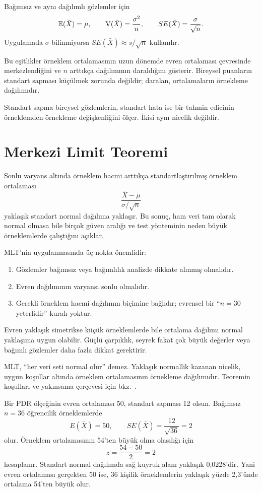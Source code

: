 Bağımsız ve aynı dağılımlı gözlemler için
\[
\mathbb{E}(\bar X)=\mu,
\qquad
\operatorname{V}(\bar X)=\frac{\sigma^2}{n},
\qquad
SE(\bar X)=\frac{\sigma}{\sqrt n}.
\]
Uygulamada $\sigma$ bilinmiyorsa $SE(\bar X)\approx s/\sqrt n$ kullanılır.

Bu eşitlikler örneklem ortalamasının uzun dönemde evren ortalaması çevresinde
merkezlendiğini ve $n$ arttıkça dağılımının daraldığını gösterir. Bireysel
puanların standart sapması küçülmek zorunda değildir; daralan, ortalamaların
örnekleme dağılımıdır.

\begin{mistakebox}
Standart sapma bireysel gözlemlerin, standart hata ise bir tahmin edicinin
örneklemden örnekleme değişkenliğini ölçer. İkisi aynı nicelik değildir.
\end{mistakebox}

\section{Merkezi Limit Teoremi}

Sonlu varyans altında örneklem hacmi arttıkça standartlaştırılmış örneklem
ortalaması
\[
\frac{\bar X-\mu}{\sigma/\sqrt n}
\]
yaklaşık standart normal dağılıma yaklaşır. Bu sonuç, ham veri tam olarak
normal olmasa bile birçok güven aralığı ve test yönteminin neden büyük
örneklemlerde çalıştığını açıklar.

MLT'nin uygulanmasında üç nokta önemlidir:

\begin{enumerate}
  \item Gözlemler bağımsız veya bağımlılık analizde dikkate alınmış olmalıdır.
  \item Evren dağılımının varyansı sonlu olmalıdır.
  \item Gerekli örneklem hacmi dağılımın biçimine bağlıdır; evrensel bir ``$n=30$ yeterlidir'' kuralı yoktur.
\end{enumerate}

Evren yaklaşık simetrikse küçük örneklemlerde bile ortalama dağılımı normal
yaklaşıma uygun olabilir. Güçlü çarpıklık, seyrek fakat çok büyük değerler veya
bağımlı gözlemler daha fazla dikkat gerektirir.

MLT, ``her veri seti normal olur'' demez. Yaklaşık normallik kazanan nicelik,
uygun koşullar altında örneklem ortalamasının örnekleme dağılımıdır.
Teoremin koşulları ve yakınsama çerçevesi için bkz.\
\cite{billingsley1995,dasgupta2011}.

\begin{ornek}
Bir PDR ölçeğinin evren ortalaması 50, standart sapması 12 olsun. Bağımsız
$n=36$ öğrencilik örneklemlerde
\[
E(\bar X)=50,
\qquad
SE(\bar X)=\frac{12}{\sqrt{36}}=2
\]
olur. Örneklem ortalamasının 54'ten büyük olma olasılığı için
\[
z=\frac{54-50}{2}=2
\]
hesaplanır. Standart normal dağılımda sağ kuyruk alanı yaklaşık 0,0228'dir.
Yani evren ortalaması gerçekten 50 ise, 36 kişilik örneklemlerin yaklaşık
yüzde 2,3'ünde ortalama 54'ten büyük olur.
\end{ornek}

